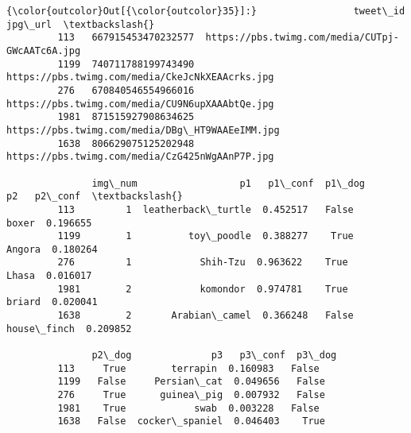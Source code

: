 \documentclass[11pt]{article}
\begin{document}
\begin{Verbatim}[commandchars=\\\{\}]
{\color{outcolor}Out[{\color{outcolor}35}]:}                 tweet\_id                                          jpg\_url  \textbackslash{}
         113   667915453470232577  https://pbs.twimg.com/media/CUTpj-GWcAATc6A.jpg   
         1199  740711788199743490  https://pbs.twimg.com/media/CkeJcNkXEAAcrks.jpg   
         276   670840546554966016  https://pbs.twimg.com/media/CU9N6upXAAAbtQe.jpg   
         1981  871515927908634625  https://pbs.twimg.com/media/DBg\_HT9WAAEeIMM.jpg   
         1638  806629075125202948  https://pbs.twimg.com/media/CzG425nWgAAnP7P.jpg   
         
               img\_num                  p1   p1\_conf  p1\_dog           p2   p2\_conf  \textbackslash{}
         113         1  leatherback\_turtle  0.452517   False        boxer  0.196655   
         1199        1          toy\_poodle  0.388277    True       Angora  0.180264   
         276         1            Shih-Tzu  0.963622    True        Lhasa  0.016017   
         1981        2            komondor  0.974781    True       briard  0.020041   
         1638        2       Arabian\_camel  0.366248   False  house\_finch  0.209852   
         
               p2\_dog              p3   p3\_conf  p3\_dog  
         113     True        terrapin  0.160983   False  
         1199   False     Persian\_cat  0.049656   False  
         276     True      guinea\_pig  0.007932   False  
         1981    True            swab  0.003228   False  
         1638   False  cocker\_spaniel  0.046403    True  
\end{Verbatim}
            
\end{document}
